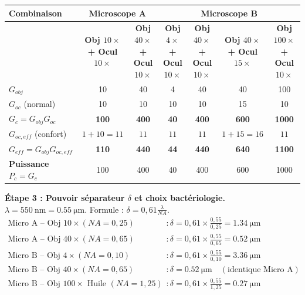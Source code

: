 \documentclass[11pt]{article}
\begin{document}
\begin{exoresolu}
\begin{center}
\begin{tabular}{|l|cc|cccc|}\hline
\textbf{Combinaison} & \multicolumn{2}{c|}{\textbf{Microscope A}} & \multicolumn{4}{c|}{\textbf{Microscope B}} \\ \hline
 & \textbf{Obj $10\times$ + Ocul $10\times$} & \textbf{Obj $40\times$ + Ocul $10\times$} & \textbf{Obj $4\times$ + Ocul $10\times$} & \textbf{Obj $40\times$ + Ocul $10\times$} & \textbf{Obj $40\times$ + Ocul $15\times$} & \textbf{Obj $100\times$ + Ocul $10\times$} \\ \hline
$G_{obj}$ & 10 & 40 & 4 & 40 & 40 & 100 \\
$G_{oc}$ (normal) & 10 & 10 & 10 & 10 & 15 & 10 \\
\textbf{$G_c = G_{obj}G_{oc}$} & \textbf{100} & \textbf{400} & \textbf{40} & \textbf{400} & \textbf{600} & \textbf{1000} \\
$G_{oc,eff}$ (confort) & $1+10=11$ & $11$ & $11$ & $11$ & $1+15=16$ & $11$ \\
\textbf{$G_{eff} = G_{obj}G_{oc,eff}$} & \textbf{110} & \textbf{440} & \textbf{44} & \textbf{440} & \textbf{640} & \textbf{1100} \\
\textbf{Puissance $P_c = G_c$} & 100 & 400 & 40 & 400 & 600 & 1000 \\ \hline
\end{tabular}
\end{center}

\medskip
\noindent \textbf{Étape 3 : Pouvoir séparateur $\delta$ et choix bactériologie.}
\medskip
\noindent $\lambda = \SI{550}{\nm} = \SI{0,55}{\um}$. Formule : $\delta = 0,61 \frac{\lambda}{NA}$.
\begin{align*}
\text{Micro A -- Obj }10\times (NA=0,25) &: \delta = 0,61 \times \frac{0,55}{0,25} = \SI{1,34}{\um} \\
\text{Micro A -- Obj }40\times (NA=0,65) &: \delta = 0,61 \times \frac{0,55}{0,65} = \SI{0,52}{\um} \\
\text{Micro B -- Obj }4\times (NA=0,10) &: \delta = 0,61 \times \frac{0,55}{0,10} = \SI{3,36}{\um} \\
\text{Micro B -- Obj }40\times (NA=0,65) &: \delta = \SI{0,52}{\um} \quad (\text{identique Micro A}) \\
\text{Micro B -- Obj }100\times \text{ Huile } (NA=1,25) &: \delta = 0,61 \times \frac{0,55}{1,25} = \SI{0,27}{\um}
\end{align*}


\end{exoresolu}
\end{document}
